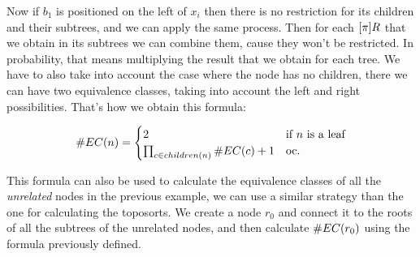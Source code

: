 
Now if $b_1$ is positioned on the left of $x_i$ then there is no restriction for its children and their subtrees, and we can apply the same process. Then for each $[\pi]R$ that we obtain in its subtrees we can combine them, cause they won't be restricted. In probability, that means multiplying the result that we obtain for each tree. We have to also take into account the case where the node has no children, there we can have two equivalence classes, taking into account the left and right possibilities. That's how we obtain this formula: 

\label{formula:number_of_equiv_classes}
\[
\#EC(n) = 
\begin{cases} 
2 & \text{if $n$ is a leaf} \\
\prod_{c \in children(n)} \#EC(c) + 1 & \text{oc.}
\end{cases}
\]

This formula can also be used to calculate the equivalence classes of all the \emph{unrelated} nodes in the previous example, we can use a similar strategy than the one for calculating the toposorts. We create a node $r_0$ and connect it to the roots of all the subtrees of the unrelated nodes, and then calculate $\#EC(r_0)$ using the formula previously defined. 

